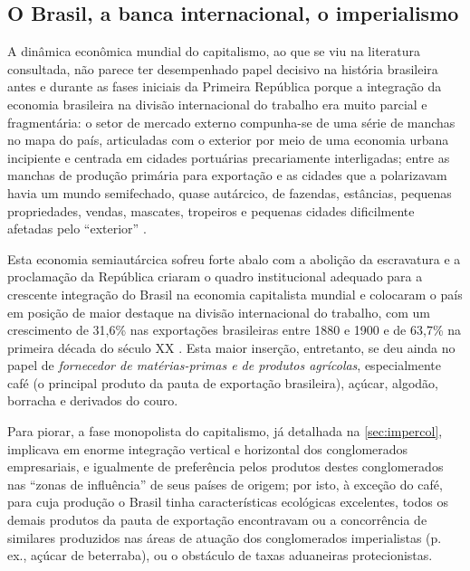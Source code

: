 \subsection{O Brasil, a banca internacional, o imperialismo}\label{subsec:brasimper}

A dinâmica econômica mundial do capitalismo, ao que se viu na literatura consultada, não parece ter desempenhado papel decisivo na história brasileira antes e durante as fases iniciais da Primeira República porque a integração da economia brasileira na divisão internacional do trabalho era muito parcial e fragmentária: o setor de mercado externo compunha-se de uma série de manchas no mapa do país, articuladas com o exterior por meio de uma economia urbana incipiente e centrada em cidades portuárias precariamente interligadas; entre as manchas de produção primária para exportação e as cidades que a polarizavam havia um mundo semifechado, quase autárcico, de fazendas, estâncias, pequenas propriedades, vendas, mascates, tropeiros e pequenas cidades dificilmente afetadas pelo ``exterior'' \cite[p.~350]{singer_braecomu_1977}.

Esta economia semiautárcica sofreu forte abalo com a abolição da escravatura e a proclamação da República criaram o quadro institucional adequado para a crescente integração do Brasil na economia capitalista mundial e colocaram o país em posição de maior destaque na divisão internacional do trabalho, com um crescimento de 31,6\% nas exportações brasileiras entre 1880 e 1900 e de 63,7\% na primeira década do século XX \cite[p.~352]{singer_braecomu_1977}. Esta maior inserção, entretanto, se deu ainda no papel de \textit{fornecedor de matérias-primas e de produtos agrícolas}, especialmente café (o principal produto da pauta de exportação brasileira), açúcar, algodão, borracha e derivados do couro. 





Para piorar, a fase monopolista do capitalismo, já detalhada na \autoref{sec:impercol}, implicava em enorme integração vertical e horizontal dos conglomerados empresariais, e igualmente de preferência pelos produtos destes conglomerados nas ``zonas de influência'' de seus países de origem; por isto, à exceção do café, para cuja produção o Brasil tinha características ecológicas excelentes, todos os demais produtos da pauta de exportação encontravam ou a concorrência de similares produzidos nas áreas de atuação dos conglomerados imperialistas (p. ex., açúcar de beterraba), ou o obstáculo de taxas aduaneiras protecionistas. 

